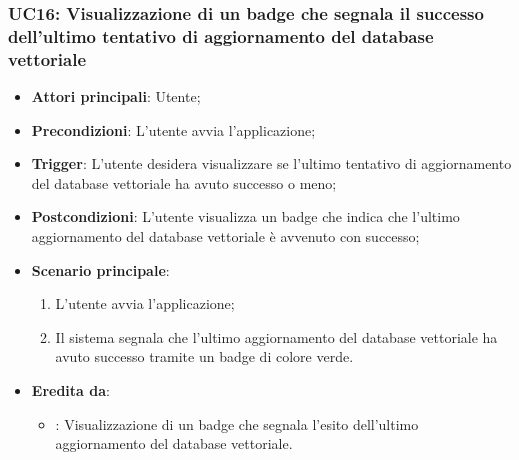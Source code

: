 \subsubsection{UC16: Visualizzazione di un badge che segnala il successo dell'ultimo tentativo di aggiornamento del database vettoriale}
\begin{itemize}
    \item \textbf{Attori principali}: Utente;
    \item \textbf{Precondizioni}: L'utente avvia l'applicazione;
    \item \textbf{Trigger}: L'utente desidera visualizzare se l'ultimo tentativo di aggiornamento del database vettoriale
    ha avuto successo o meno;
    \item \textbf{Postcondizioni}: L'utente visualizza un badge che indica che l'ultimo aggiornamento del database vettoriale
    è avvenuto con successo;
    \item \textbf{Scenario principale}:
    \begin{enumerate}
        \item L'utente avvia l'applicazione;
        \item Il sistema segnala che l'ultimo aggiornamento del database vettoriale ha avuto successo tramite un badge di colore verde.
    \end{enumerate}
    \item \textbf{Eredita da}:
    \begin{itemize}
        \item {}: Visualizzazione di un badge che segnala l'esito dell'ultimo aggiornamento del database vettoriale.
    \end{itemize}
\end{itemize}

\hypertarget{UC17}{}
